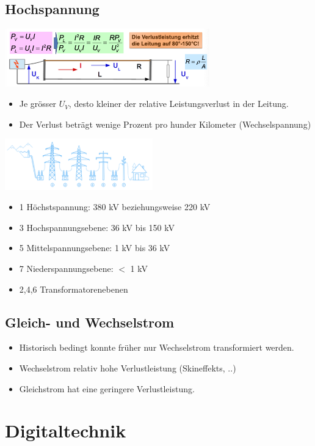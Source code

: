 \documentclass[8pt,a4paper]{scrartcl}
\begin{document}
\begin{multicols*}{3}
		\subsection{Hochspannung}
			\includegraphics[height=2.5cm]{img/hochspannung1.png} 
			\begin{itemize}\itemsep0pt
				\item Je grösser $U_{V}$, desto kleiner der relative Leistungsverlust in der Leitung.
				\item Der Verlust beträgt wenige Prozent pro hunder Kilometer (Wechselspannung)
			\end{itemize}
			\includegraphics[height=2.2cm]{img/hochspannung2.png} 
			\begin{itemize}\itemsep0pt
				\item 1 Höchstspannung: 380 kV beziehungsweise 220 kV 
				\item 3 Hochspannungsebene: 36 kV bis 150 kV
				\item 5 Mittelspannungsebene: 1 kV bis 36 kV
				\item 7 Niederspannungsebene: $<$ 1 kV 
				\item 2,4,6 Transformatorenebenen 
			\end{itemize}
		\subsection{Gleich- und Wechselstrom}
			\begin{itemize}\itemsep0pt
				\item Historisch bedingt konnte früher nur Wechselstrom transformiert werden. 
				\item Wechselstrom relativ hohe Verlustleistung (Skineffekts, ..)
				\item Gleichstrom hat eine geringere Verlustleistung.
			\end{itemize}

		\section{Digitaltechnik}

\end{multicols*}
\end{document}
